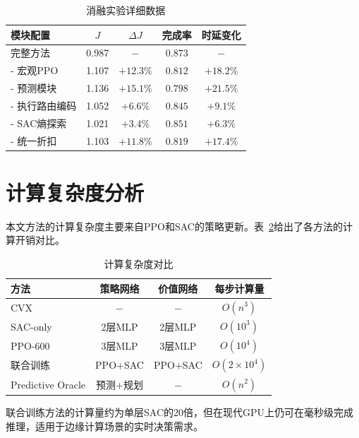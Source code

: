 \begin{table}[htbp]
\centering
\caption{消融实验详细数据}
\label{tab:ablation_detail}
\begin{tabular}{lcccc}
\toprule
模块配置 & $J$ & $\Delta J$ & 完成率 & 时延变化 \\
\midrule
完整方法 & 0.987 & $-$ & $0.873$ & $-$ \\
- 宏观PPO & 1.107 & $+12.3\%$ & $0.812$ & $+18.2\%$ \\
- 预测模块 & 1.136 & $+15.1\%$ & $0.798$ & $+21.5\%$ \\
- 执行路由编码 & 1.052 & $+6.6\%$ & $0.845$ & $+9.1\%$ \\
- SAC熵探索 & 1.021 & $+3.4\%$ & $0.851$ & $+6.3\%$ \\
- 统一折扣 & 1.103 & $+11.8\%$ & $0.819$ & $+17.4\%$ \\
\bottomrule
\end{tabular}
\end{table}

\section{计算复杂度分析}

本文方法的计算复杂度主要来自PPO和SAC的策略更新。表~\ref{tab:complexity}给出了各方法的计算开销对比。

\begin{table}[htbp]
\centering
\caption{计算复杂度对比}
\label{tab:complexity}
\begin{tabular}{lccc}
\toprule
方法 & 策略网络 & 价值网络 & 每步计算量 \\
\midrule
CVX & $-$ & $-$ & $O(n^3)$ \\
SAC-only & 2层MLP & 2层MLP & $O(10^3)$ \\
PPO-600 & 3层MLP & 3层MLP & $O(10^4)$ \\
联合训练 & PPO+SAC & PPO+SAC & $O(2\times10^4)$ \\
Predictive Oracle & 预测+规划 & $-$ & $O(n^2)$ \\
\bottomrule
\end{tabular}
\end{table}

联合训练方法的计算量约为单层SAC的20倍，但在现代GPU上仍可在毫秒级完成推理，适用于边缘计算场景的实时决策需求。
